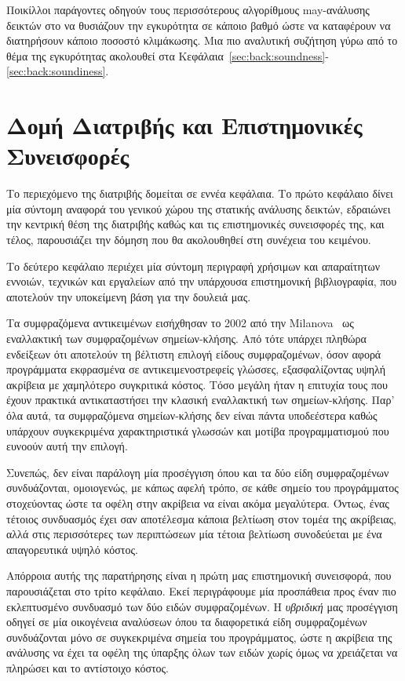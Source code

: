 Ποικίλλοι παράγοντες οδηγούν τους περισσότερους αλγορίθμους {\en may}-ανάλυσης δεικτών στο να θυσιάζουν την εγκυρότητα σε κάποιο βαθμό ώστε να καταφέρουν να διατηρήσουν κάποιο ποσοστό κλιμάκωσης. Μια πιο αναλυτική συζήτηση γύρω από το θέμα της εγκυρότητας ακολουθεί στα Κεφάλαια~\ref{sec:back:soundness}-\ref{sec:back:soundiness}.



\section*{Δομή Διατριβής και Επιστημονικές Συνεισφορές}

Το περιεχόμενο της διατριβής δομείται σε εννέα κεφάλαια. Το πρώτο κεφάλαιο δίνει μία σύντομη αναφορά του γενικού χώρου της στατικής ανάλυσης δεικτών, εδραιώνει την κεντρική θέση της διατριβής καθώς και τις επιστημονικές συνεισφορές της, και τέλος, παρουσιάζει την δόμηση που θα ακολουθηθεί στη συνέχεια του κειμένου.

Το δεύτερο κεφάλαιο περιέχει μία σύντομη περιγραφή χρήσιμων και απαραίτητων εννοιών, τεχνικών και εργαλείων από την υπάρχουσα επιστημονική βιβλιογραφία, που αποτελούν την υποκείμενη βάση για την δουλειά μας.


Τα συμφραζόμενα αντικειμένων εισήχθησαν το 2002 από την {\en Milanova}~\cite{issta:2002:Milanova} ως εναλλακτική των συμφραζομένων σημείων-κλήσης. Από τότε υπάρχει πληθώρα ενδείξεων ότι αποτελούν τη βέλτιστη επιλογή είδους συμφραζομένων, όσον αφορά προγράμματα εκφρασμένα σε αντικειμενοστρεφείς γλώσσες, εξασφαλίζοντας υψηλή ακρίβεια με χαμηλότερο συγκριτικά κόστος. Τόσο μεγάλη ήταν η επιτυχία τους που έχουν πρακτικά αντικαταστήσει την κλασική εναλλακτική των σημείων-κλήσης. Παρ' όλα αυτά, τα συμφραζόμενα σημείων-κλήσης δεν είναι πάντα υποδεέστερα καθώς υπάρχουν συγκεκριμένα χαρακτηριστικά γλωσσών και μοτίβα προγραμματισμού που ευνοούν αυτή την επιλογή.

Συνεπώς, δεν είναι παράλογη μία προσέγγιση όπου και τα δύο είδη συμφραζομένων συνδυάζονται, ομοιογενώς, με κάπως αφελή τρόπο, σε κάθε σημείο του προγράμματος στοχεύοντας ώστε τα οφέλη στην ακρίβεια να είναι ακόμα μεγαλύτερα. Όντως, ένας τέτοιος συνδυασμός έχει σαν αποτέλεσμα κάποια βελτίωση στον τομέα της ακρίβειας, αλλά στις περισσότερες των περιπτώσεων μία τέτοια βελτίωση συνοδεύεται με ένα απαγορευτικά υψηλό κόστος.

Απόρροια αυτής της παρατήρησης είναι η πρώτη μας επιστημονική συνεισφορά, που παρουσιάζεται στο τρίτο κεφάλαιο. Εκεί περιγράφουμε μία προσπάθεια προς έναν πιο εκλεπτυσμένο συνδυασμό των δύο ειδών συμφραζομένων. Η \emph{υβριδική} μας προσέγγιση οδηγεί σε μία οικογένεια αναλύσεων όπου τα διαφορετικά είδη συμφραζομένων συνδυάζονται μόνο σε συγκεκριμένα σημεία του προγράμματος, ώστε η ακρίβεια της ανάλυσης να έχει τα οφέλη της ύπαρξης όλων των ειδών χωρίς όμως να χρειάζεται να πληρώσει και το αντίστοιχο κόστος.

